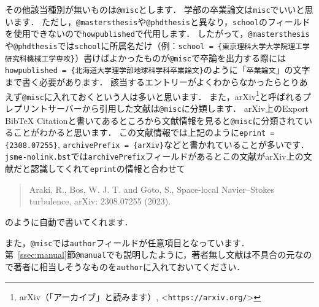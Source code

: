 \documentclass[a4paper,fleqn,uplatex,dvipdfmx]{jsarticle}
\makeatletter
\newcommand{\jsmefile}{\texttt{jsme-nolink.bst}}
\newcommand{\ttmanual}{\texttt{@manual}}
\newcommand{\ttmastersthesis}{\texttt{@mastersthesis}}
\newcommand{\ttmisc}{\texttt{@misc}}
\newcommand{\ttphdthesis}{\texttt{@phdthesis}}
\makeatother
\begin{document}
その他該当種別が無いものは\ttmisc とします．
学部の卒業論文は\verb|misc|でいいと思います．
ただし，\ttmastersthesis や\ttphdthesis と異なり，\verb|school|のフィールドを使用できないので\verb|howpublished|で代用します．
したがって，\ttmastersthesis や\ttphdthesis では\verb|school|に所属名だけ（例：\verb|school = {東京理科大学大学院理工学研究科機械工学専攻}|）書けばよかったものが\ttmisc で卒論を出力する際には\verb|howpublished = {北海道大学理学部地球科学科卒業論文}|のように「\verb|卒業論文|」の文字まで書く必要があります．
該当するエントリーがよくわからなかったらとりあえず\ttmisc に入れておくという人は多いと思います．
また，arXiv\footnote{arXiv（「アーカイブ」と読みます）, \textless\verb|https://arxiv.org/|\textgreater}と呼ばれるプレプリントサーバーから引用した文献は\ttmisc に分類します．
arXiv上のExport BibTeX Citationと書いてあるところから文献情報を見ると\ttmisc に分類されていることがわかると思います．
この文献情報では上記のように\verb|eprint = {2308.07255}|, \verb|archivePrefix = {arXiv}|などと書かれていることが多いです．
\jsmefile では\verb|archivePrefix|フィールドがあるとこの文献がarXiv上の文献だと認識してくれて\verb|eprint|の情報と合わせて
\begin{quote}
    Araki, R., Bos, W. J. T. and Goto, S., Space-local Navier--Stokes turbulence, arXiv: 2308.07255 (2023).
\end{quote}
のように自動で書いてくれます．

また，\ttmisc では\verb|author|フィールドが任意項目となっています．
第~\ref{ssec:manual}節\ttmanual でも説明したように，著者無し文献は不具合の元なので著者に相当しそうなものを\verb|author|に入れておいてください．
\end{document}
